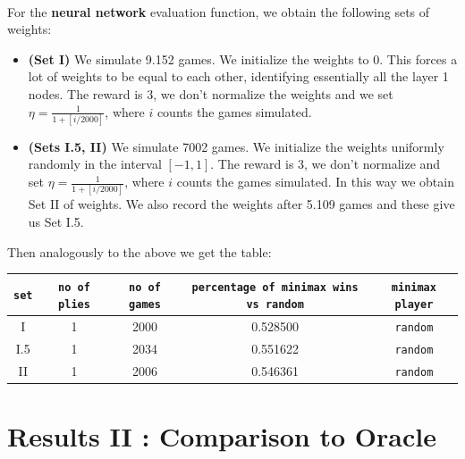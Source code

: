 \documentclass[11pt, a4paper, twoside]{amsart} %
\theoremstyle{definition}
\begin{document}
\text{}\\
For the \textbf{neural network} evaluation function, we obtain the following sets of weights:
\begin{itemize} 
\item \textbf{(Set I)} We simulate 9.152 games. We initialize the weights to $0$. This forces a lot of weights to be equal to each other, identifying essentially all the layer 1 nodes. The reward is $3$, we don't normalize the weights and we set $\eta = \frac{1}{1 + [i/2000]}$, where $i$ counts the games simulated.
\item \textbf{(Sets I.5, II)} We simulate 7002 games. We initialize the weights uniformly randomly in the interval $[-1, 1]$. The reward is $3$, we don't normalize and set $\eta = \frac{1}{1 + [i/2000]}$, where $i$ counts the games simulated. In this way we obtain Set II of weights. We also record the weights after 5.109 games and these give us Set I.5.
\end{itemize}
Then analogously to the above we get the table:
\begin{center}
\begin{tabular}{ | c | c | c | c | c | }
\hline
\texttt{set} & \texttt{no of plies} & \texttt{no of games} & \texttt{percentage of minimax wins vs random} & \texttt{minimax player}\\ \hline
I & 1 & 2000 & 0.528500 & \texttt{random}\\ \hline
I.5 & 1 & 2034 & 0.551622 & \texttt{random}\\ \hline
II & 1 & 2006 & 0.546361 & \texttt{random}\\ \hline
\end{tabular}
\end{center}

\section{Results II : Comparison to Oracle}
\end{document}
